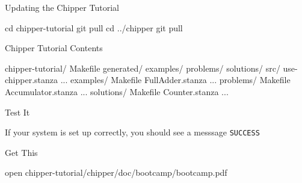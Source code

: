 \documentclass[xcolor=pdflatex,dvipsnames,table]{beamer}
\begin{document}
\begin{frame}[fragile]{Updating the Chipper Tutorial}

\begin{stanza}
cd chipper-tutorial
git pull
cd ../chipper
git pull
\end{stanza}
\end{frame}

\begin{frame}[fragile]{Chipper Tutorial Contents}
{
\begin{FramedSemiVerb}
chipper-tutorial/  
  Makefile
  generated/
    examples/
    problems/
    solutions/
  src/        
    use-chipper.stanza ...
  examples/   
    Makefile  
    FullAdder.stanza ...
  problems/   
    Makefile
    Accumulator.stanza ...
  solutions/  
    Makefile
    Counter.stanza ...
\end{FramedSemiVerb}
}
\end{frame}

\begin{frame}[fragile]{Test It}



\vspace{1cm}
\noindent
If your system is set up correctly, you should see a messsage \verb+SUCCESS+

\end{frame}


\begin{frame}[fragile]{Get This}

\begin{bash}
open chipper-tutorial/chipper/doc/bootcamp/bootcamp.pdf
\end{bash}

\end{frame}
\end{document}
